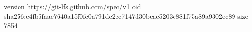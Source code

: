 version https://git-lfs.github.com/spec/v1
oid sha256:e4fb5faae7640a15f0fc0a791dc2ec7147d30beac5203c881f75a89a9302ec89
size 7854
